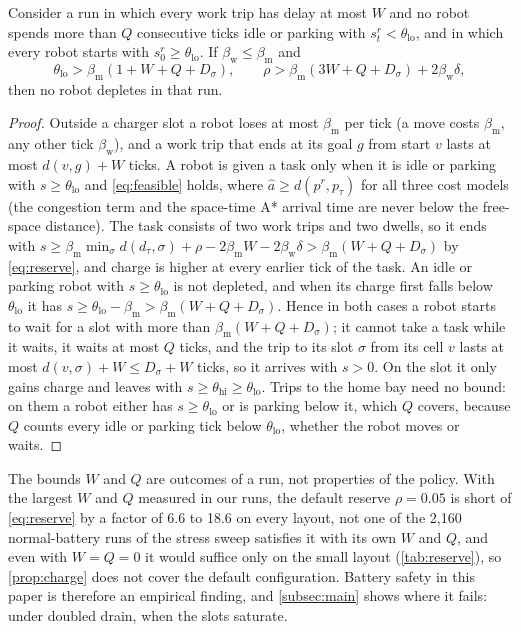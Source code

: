 \begin{proposition}\label{prop:charge}
Consider a run in which every work trip has delay at most $W$ and no robot spends
more than $Q$ consecutive ticks idle or parking with
$s^r_t<\theta_{\mathrm{lo}}$, and in which every robot starts with
$s^r_0\ge\theta_{\mathrm{lo}}$. If $\beta_{\mathrm{w}}\le\beta_{\mathrm{m}}$ and
\begin{equation}\label{eq:reserve}
  \theta_{\mathrm{lo}} > \beta_{\mathrm{m}}(1+W+Q+D_\sigma),
  \qquad
  \rho > \beta_{\mathrm{m}}(3W+Q+D_\sigma) + 2\beta_{\mathrm{w}}\delta,
\end{equation}
then no robot depletes in that run.
\end{proposition}
\begin{proof}
Outside a charger slot a robot loses at most $\beta_{\mathrm{m}}$ per tick
(a move costs $\beta_{\mathrm{m}}$, any other tick $\beta_{\mathrm{w}}$), and
a work trip that ends at its goal $g$ from start $v$ lasts at most $d(v,g)+W$
ticks. A robot is given a task only when it is idle or parking with
$s\ge\theta_{\mathrm{lo}}$ and \cref{eq:feasible} holds, where
$\hat a\ge d(p^r,p_\tau)$ for all three cost models (the congestion term and
the space-time A* arrival time are never below the free-space distance). The
task consists of two work trips and two dwells, so it ends with
$s\ge\beta_{\mathrm{m}}\min_\sigma d(d_\tau,\sigma)+\rho-2\beta_{\mathrm{m}}W-2\beta_{\mathrm{w}}\delta>\beta_{\mathrm{m}}(W+Q+D_\sigma)$
by \cref{eq:reserve}, and charge is higher at every earlier tick of the
task. An idle or parking robot with $s\ge\theta_{\mathrm{lo}}$ is not
depleted, and when its charge first falls below $\theta_{\mathrm{lo}}$ it
has $s\ge\theta_{\mathrm{lo}}-\beta_{\mathrm{m}}>\beta_{\mathrm{m}}(W+Q+D_\sigma)$.
Hence in both cases a robot starts to wait for a slot with more than
$\beta_{\mathrm{m}}(W+Q+D_\sigma)$; it cannot take a task while it waits,
it waits at most $Q$ ticks, and the trip to its slot $\sigma$ from its cell
$v$ lasts at most $d(v,\sigma)+W\le D_\sigma+W$ ticks, so it arrives with
$s>0$. On the slot it only gains charge and leaves with
$s\ge\theta_{\mathrm{hi}}\ge\theta_{\mathrm{lo}}$. Trips to the home bay
need no bound: on them a robot either has $s\ge\theta_{\mathrm{lo}}$ or is
parking below it, which $Q$ covers, because $Q$ counts every idle or parking
tick below $\theta_{\mathrm{lo}}$, whether the robot moves or waits.
\end{proof}

The bounds $W$ and $Q$ are outcomes of a run, not properties of the policy.
With the largest $W$ and $Q$ measured in our runs, the default reserve
$\rho=0.05$ is short of \cref{eq:reserve} by a factor of 6.6 to 18.6 on
every layout, not one of the 2{,}160 normal-battery runs of the stress sweep
satisfies it with its own $W$ and $Q$, and even with $W=Q=0$ it would
suffice only on the small layout (\cref{tab:reserve}), so
\cref{prop:charge} does not cover the default configuration. Battery safety
in this paper is therefore an empirical finding, and \cref{subsec:main}
shows where it fails: under doubled drain, when the slots saturate.

